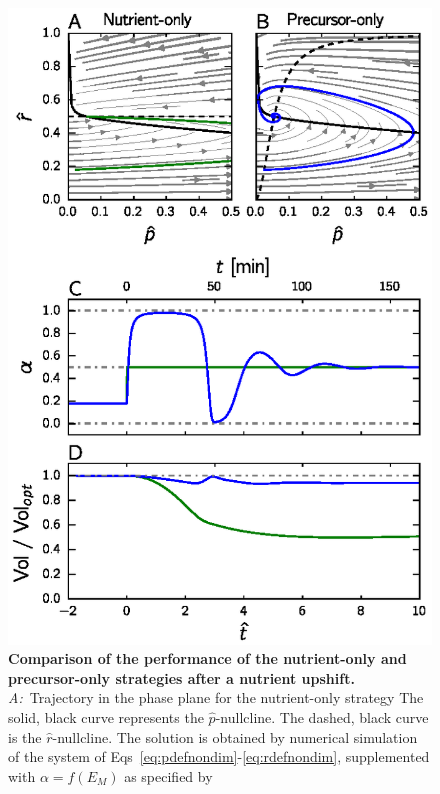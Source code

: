 \begin{figure}
\centering
\includegraphics[scale=1]{./Fig/Fig6.eps}
\caption[Comparison of the performance of the nutrient-only and precursor-only strategies after a nutrient upshift]{
{\bf Comparison of the performance of the nutrient-only and precursor-only strategies after a nutrient upshift.}\\
\textit{A:}~Trajectory in the phase plane for the nutrient-only strategy 
The solid, black curve represents the $\hat{p}$-nullcline.
The dashed, black curve is the $\hat{r}$-nullcline.
The solution is obtained by numerical simulation of the system of Eqs~\ref{eq:pdefnondim}-\ref{eq:rdefnondim}, supplemented with $\alpha = f(E_M)$ as specified by 
}
\end{figure}
